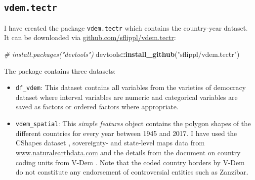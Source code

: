 \documentclass[]{report}
\newenvironment{Shaded}{\begin{snugshade}}{\end{snugshade}}
\newcommand{\KeywordTok}[1]{\textcolor[rgb]{0.13,0.29,0.53}{\textbf{#1}}}
\newcommand{\DecValTok}[1]{\textcolor[rgb]{0.00,0.00,0.81}{#1}}
\newcommand{\StringTok}[1]{\textcolor[rgb]{0.31,0.60,0.02}{#1}}
\newcommand{\CommentTok}[1]{\textcolor[rgb]{0.56,0.35,0.01}{\textit{#1}}}
\newcommand{\OperatorTok}[1]{\textcolor[rgb]{0.81,0.36,0.00}{\textbf{#1}}}
\newcommand{\NormalTok}[1]{#1}
\providecommand{\tightlist}{%
  \setlength{\itemsep}{0pt}\setlength{\parskip}{0pt}}
\theoremstyle{definition}
\theoremstyle{definition}
\theoremstyle{definition}
\theoremstyle{remark}
\begin{document}
\subsection{\texorpdfstring{\texttt{vdem.tectr}}{vdem.tectr}}\label{vdem.tectr}

I have created the package \texttt{vdem.tectr} which contains the
country-year dataset. It can be downloaded via
\href{github}{github.com/sflippl/vdem.tectr}:

\begin{Shaded}
\begin{Highlighting}[]
\CommentTok{# install.packages("devtools")}
\NormalTok{devtools}\OperatorTok{::}\KeywordTok{install_github}\NormalTok{(}\StringTok{"sflippl/vdem.tectr"}\NormalTok{)}
\end{Highlighting}
\end{Shaded}

The package contains three datasets:

\begin{itemize}
\tightlist
\item
  \texttt{df\_vdem}: This dataset contains all variables from the
  varieties of democracy dataset where interval variables are numeric
  and categorical variables are saved as factors or ordered factors
  where appropriate.
\item
  \texttt{vdem\_spatial}: This \emph{simple features} object \citep{sf}
  contains the polygon shapes of the different countries for every year
  between 1945 and 2017. I have used the CShapes dataset
  \citep[\citet{Weidmann2010a}]{Weidmann2010}, sovereignty- and
  state-level maps data from
  \href{Natural\%20Earth}{www.naturalearthdata.com} and the details from
  the document on country coding units from V-Dem \citep{Coppedge2018}.
  Note that the coded country borders by V-Dem do not constitute any
  endorsement of controversial entities such as Zanzibar.
\end{itemize}

\begin{Shaded}
\end{Shaded}
\end{document}
